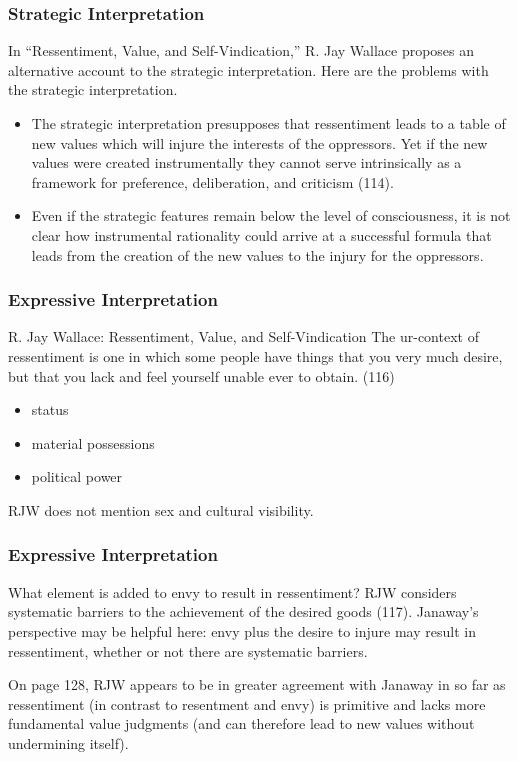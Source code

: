 \documentclass[xcolor=dvipsnames]{beamer}
\begin{document}
\begin{frame}
  \frametitle{Strategic Interpretation}
  In ``Ressentiment, Value, and Self-Vindication,'' R. Jay Wallace proposes an alternative account to the
  \alert{strategic interpretation}. Here are the problems with the
  strategic interpretation.
  \begin{itemize}
  \item The strategic interpretation presupposes that ressentiment
    leads to a table of new values which will injure the interests of
    the oppressors. Yet if the new values were created
    \alert{instrumentally} they cannot serve \alert{intrinsically} as
    a framework for preference, deliberation, and criticism (114).
  \item Even if the strategic features remain below the level of
    consciousness, it is not clear how instrumental rationality could
    arrive at a successful formula that leads from the creation of the
    new values to the injury for the oppressors.
  \end{itemize}
\end{frame}

\begin{frame}
  \frametitle{Expressive Interpretation}
  \begin{block}{R. Jay Wallace: Ressentiment, Value, and
      Self-Vindication}
    The ur-context of ressentiment is one in which some people have
    things that you very much desire, but that you lack and feel
    yourself unable ever to obtain. (116)
  \end{block}
  \begin{itemize}
  \item status
  \item material possessions
  \item political power
  \end{itemize}
  RJW does not mention sex and cultural visibility. 
\end{frame}

\begin{frame}
  \frametitle{Expressive Interpretation}
  What element is added to envy to result in ressentiment? RJW
  considers systematic barriers to the achievement of the desired
  goods (117). Janaway's perspective may be helpful here: envy plus
  the desire to injure may result in ressentiment, whether or not
  there are systematic barriers.

  \bigskip

  On page 128, RJW appears to be in greater agreement with Janaway in
  so far as ressentiment (in contrast to resentment and envy) is
  primitive and lacks more fundamental value judgments (and can
  therefore lead to new values without undermining itself).
\end{frame}
\end{document}
